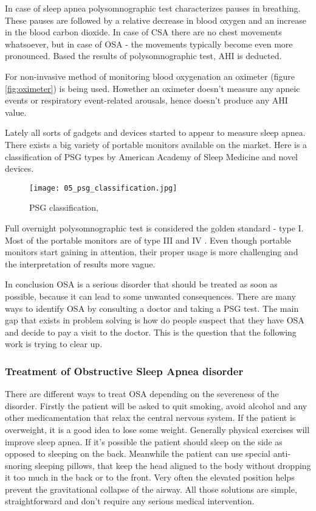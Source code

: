 In case of sleep apnea polysomnographic test characterizes pauses in breathing. These pauses are followed by a relative decrease in blood oxygen and an increase in the blood carbon dioxide. In case of CSA there are no chest movements whatsoever, but in case of OSA - the movements typically become even more pronounced. Based the results of polysomnographic test, AHI is deducted. 

For non-invasive method of monitoring blood oxygenation an oximeter (figure \ref{fig:oximeter}) is being used. Howether an oximeter doesn't measure any apneic events or respiratory event-related arousals, hence doesn't produce any AHI value.

Lately all sorts of gadgets and devices started to appear to measure sleep apnea. There exists a big variety of portable monitors available on the market. Here is a classification of PSG types by American Academy of Sleep Medicine and novel devices.

\begin{figure}[!ht]
\centering
\texttt{[image: 05\_psg\_classification.jpg]}
\caption{PSG classification, \cite{PSG}}
\label{fig:psg_classification}
\end{figure}

Full overnight polysomnographic test is considered the golden standard - type I. Most of the portable monitors are of type III and IV \cite{devices}. Even though portable monitors start gaining in attention, their proper usage is more challenging and the interpretation of results more vague.

In conclusion OSA is a serious disorder that should be treated as soon as possible, because it can lead to some unwanted consequences. There are many ways to identify OSA by consulting a doctor and taking a PSG test. The main gap that exists in problem solving is how do people suspect that they have OSA and decide to pay a visit to the doctor. This is the question that the following work is trying to clear up.

\subsubsection{Treatment of Obstructive Sleep Apnea disorder}
There are different ways to treat OSA depending on the severeness of the disorder. Firstly the patient will be asked to quit smoking, avoid alcohol and any other medicamentation that relax the central nervous system. If the patient is overweight, it is a good idea to lose some weight. Generally physical exercises will improve sleep apnea. If it's possible the patient should sleep on the side as opposed to sleeping on the back. Meanwhile the patient can use special anti-snoring sleeping pillows, that keep the head aligned to the body without dropping it too much in the back or to the front. Very often the elevated position helps prevent the gravitational collapse of the airway. All those solutions are simple, straightforward and don't require any serious medical intervention.


